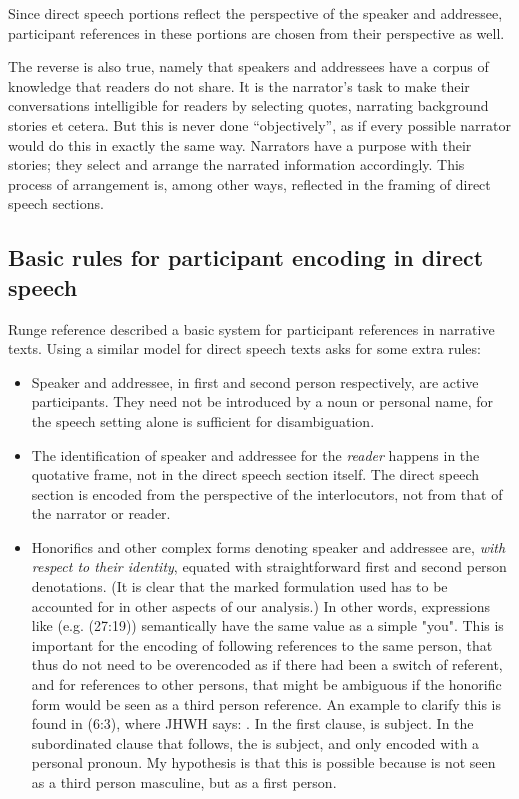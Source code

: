 \documentclass[twoside,a4paper,10pt]{article}
\newcommand{\fixme}[1]{{\color{red} #1}}
\newcommand{\cl}[2]{\begingroup\beginL\begingroup\color{#1}\beginR#2\endR\endgroup\endL\endgroup}
\newcommand{\hebr}[1]{\cjRL{#1}}
\begin{document}
Since direct speech portions reflect the perspective of the speaker and addressee, participant references in these portions are chosen from their perspective as well.

The reverse is also true, namely that speakers and addressees have a corpus of knowledge that readers do not share. It is the narrator's task to make their conversations intelligible for readers by selecting quotes, narrating background stories et cetera. But this is never done ``objectively'', as if every possible narrator would do this in exactly the same way. Narrators have a purpose with their stories; they select and arrange the narrated information accordingly. This process of arrangement is, among other ways, reflected in the framing of direct speech sections.

\subsection{Basic rules for participant encoding in direct speech}
Runge \fixme{reference} described a basic system for participant references in narrative texts. Using a similar model for direct speech texts asks for some extra rules:
\begin{itemize}
    \item Speaker and addressee, in first and second person respectively, are active participants. They need not be introduced by a noun or personal name, for the speech setting alone is sufficient for disambiguation.
    \item The identification of speaker and addressee for the \emph{reader} happens in the quotative frame, not in the direct speech section itself. The direct speech section is encoded from the perspective of the interlocutors, not from that of the narrator or reader.
    \item Honorifics and other complex forms denoting speaker and addressee are, \emph{with respect to their identity}, equated with straightforward first and second person denotations. (It is clear that the marked formulation used has to be accounted for in other aspects of our analysis.) In other words, expressions like \hebr{NPCK} (e.g. (27:19)) semantically have the same value as a simple "you". This is important for the encoding of following references to the same person, that thus do not need to be overencoded as if there had been a switch of referent, and for references to other persons, that might be ambiguous if the honorific form would be seen as a third person reference. An example to clarify this is found in (6:3), where JHWH says: \hebr{L> JDWN \cl{red}{RWXJ} B H >DM L <WLM B C GM \cl{red}{HJW} BFR}. In the first clause, \hebr{RWXJ} is subject. In the subordinated clause that follows, the \hebr{>DM} is subject, and only encoded with a personal pronoun. My hypothesis is that this is possible because \hebr{RWXJ} is not seen as a third person masculine, but as a first person. 
\end{itemize}
\end{document}
